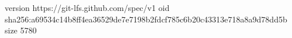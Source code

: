 version https://git-lfs.github.com/spec/v1
oid sha256:a69534c14b8ff4ea36529de7e7198b2fdcf785c6b20c43313e718a8a9d78dd5b
size 5780
